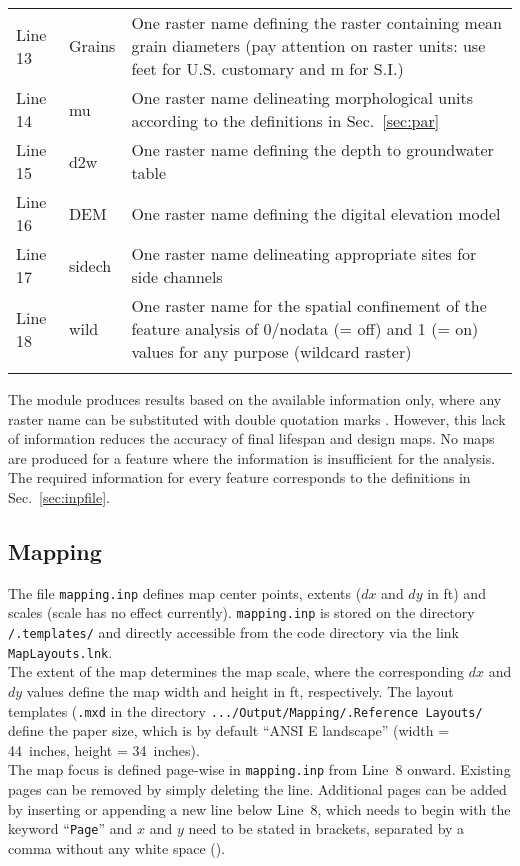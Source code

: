 \begin{tabular}{l p{} L{0.65\textwidth}}
Line 13 & Grains& One raster name defining the raster containing mean grain diameters (pay attention on raster units: use feet for U.S. customary and m for S.I.)\\ 
Line 14 & mu  & One raster name delineating morphological units according to the definitions in Sec.~\ref{sec:par}\\
Line 15 & d2w & One raster name defining the depth to groundwater table\\ 
Line 16 & DEM & One raster name defining the digital elevation model\\
Line 17 & sidech & One raster name delineating appropriate sites for side channels\\ 
Line 18 & wild & One raster name for the spatial confinement of the feature analysis of 0/nodata (= off) and 1 (= on) values for any purpose (wildcard raster)\\
\\
\end{tabular}

The module produces results based on the available information only, where any raster name can be substituted with double quotation marks . However, this lack of information reduces the accuracy of final lifespan and design maps. No maps are produced for a feature where the information is insufficient for the analysis. The required information for every feature corresponds to the definitions in Sec.~\ref{sec:inpfile}.

\subsection{Mapping}\label{sec:inpmaps}
The file \texttt{mapping.inp} defines map center points, extents ($dx$ and $dy$ in ft) and scales (scale has no effect currently). \texttt{mapping.inp} is stored on the directory \texttt{/.templates/} and directly accessible from the code directory via the link \texttt{MapLayouts.lnk}.\\

The extent of the map determines the map scale, where the corresponding $dx$ and $dy$ values define the map width and height in ft, respectively. The layout templates (\texttt{.mxd} in the directory \texttt{.../Output/Mapping/.Reference Layouts/} define the paper size, which is by default ``ANSI E landscape'' (width = 44~inches, height = 34~inches).\\
The map focus is defined page-wise in \texttt{mapping.inp} from Line~8 onward. Existing pages can be removed by simply deleting the line. Additional pages can be added by inserting or appending a new line below Line~8, which needs to begin with the keyword ``\texttt{Page}'' and $x$ and $y$ need to be stated in brackets, separated by a comma without any white space ().\\

